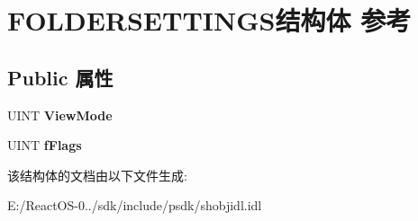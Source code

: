 \hypertarget{struct_f_o_l_d_e_r_s_e_t_t_i_n_g_s}{}\section{F\+O\+L\+D\+E\+R\+S\+E\+T\+T\+I\+N\+G\+S结构体 参考}
\label{struct_f_o_l_d_e_r_s_e_t_t_i_n_g_s}
\subsection*{Public 属性}
\begin{DoxyCompactItemize}
\item 
\mbox{\label{struct_f_o_l_d_e_r_s_e_t_t_i_n_g_s_a555589d84db5bbb0a3d0d8f217096efe}} 
U\+I\+NT {\bfseries View\+Mode}
\item 
\mbox{\label{struct_f_o_l_d_e_r_s_e_t_t_i_n_g_s_ab59774490f37a3328bbc68a9a866890b}} 
U\+I\+NT {\bfseries f\+Flags}
\end{DoxyCompactItemize}


该结构体的文档由以下文件生成\+:\begin{DoxyCompactItemize}
\item 
E\+:/\+React\+O\+S-\/0../sdk/include/psdk/shobjidl.\+idl\end{DoxyCompactItemize}
